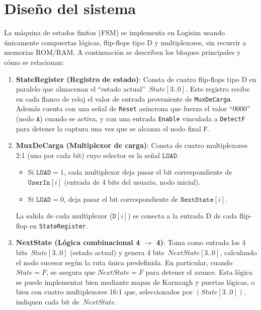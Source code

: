 \documentclass[12pt]{article}
\begin{document}
\newpage
\section{Diseño del sistema}

La máquina de estados finitos (FSM) se implementa en Logisim usando únicamente compuertas lógicas,
flip-flops tipo D y multiplexores, sin recurrir a memorias ROM/RAM. A continuación se describen
los bloques principales y cómo se relacionan:

\begin{enumerate}
  \item \textbf{StateRegister (Registro de estado)}:  
        Consta de cuatro flip-flops tipo D en paralelo que almacenan el “estado actual” 
        \(\,State[3..0]\). Este registro recibe en cada flanco de reloj el valor de entrada 
        proveniente de \texttt{MuxDeCarga}. Además cuenta con una señal de \texttt{Reset} asíncrona 
        que fuerza el valor “0000” (nodo \(\texttt{A}\)) cuando se activa, y con una entrada 
        \texttt{Enable} vinculada a \texttt{DetectF} para detener la captura una vez que se alcanza 
        el nodo final \(\texttt{F}\).  
        
  \item \textbf{MuxDeCarga (Multiplexor de carga)}:  
        Consta de cuatro multiplexores 2:1 (uno por cada bit) cuyo selector es la señal 
        \(\texttt{LOAD}\).  
        \begin{itemize}
          \item Si \(\texttt{LOAD}=1\), cada multiplexor deja pasar el bit correspondiente de
                \(\texttt{UserIn}[i]\) (entrada de 4 bits del usuario, nodo inicial).  
          \item Si \(\texttt{LOAD}=0\), deja pasar el bit correspondiente de 
                \(\texttt{NextState}[i]\).  
        \end{itemize}
        La salida de cada multiplexor (\(\texttt{D}[i]\)) se conecta a la entrada D de cada flip-flop
        en \texttt{StateRegister}.

  \item \textbf{NextState (Lógica combinacional 4 \(\to\) 4)}:  
        Toma como entrada los 4 bits \(\,State[3..0]\) (estado actual) y genera 4 bits 
        \(\,NextState[3..0]\), calculando el nodo sucesor según la ruta única predefinida.  
        En particular, cuando \(State = F\), se asegura que \(NextState = F\) para detener el avance.
        Esta lógica se puede implementar bien mediante mapas de Karnaugh y puertas lógicas, 
        o bien con cuatro multiplexores 16:1 que, seleccionados por \((State[3..0])\), indiquen 
        cada bit de \(\,NextState\).


\end{enumerate}
\end{document}
